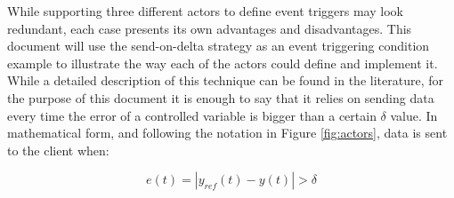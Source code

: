 While supporting three different actors to define event triggers may look redundant, each case presents its own advantages and disadvantages. This document will use the send-on-delta strategy as an event triggering condition example to illustrate the way each of the actors could define and implement it. While a detailed description of this technique can be found in the literature, for the purpose of this document it is enough to say that it relies on sending data every time the error of a controlled variable is bigger than a certain $\delta$ value. In mathematical form, and following the notation in Figure \ref{fig:actors}, data is sent to the client when:

\begin{equation}
e(t) = |y_{ref}(t) - y(t)| > \delta
\label{eq:send-on-delta}
\end{equation}

